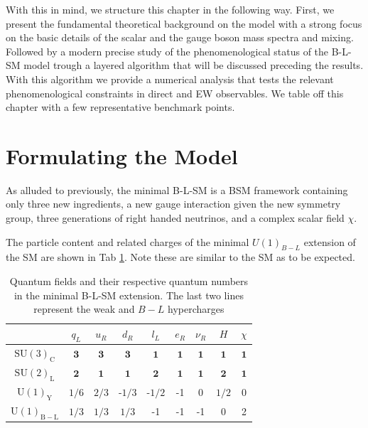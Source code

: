 \documentclass[10pt]{book}
\renewcommand{\(}{\left(}
\renewcommand{\)}{\right)}
\renewcommand{\[}{\left[}
\renewcommand{\]}{\right]}
\begin{document}
With this in mind, we structure this chapter in the following way. First, we present the fundamental theoretical background on the model with a strong focus on the basic details of the scalar and the gauge boson mass spectra and mixing. Followed by a modern precise study of the phenomenological status of the B-L-SM model trough a layered algorithm that will be discussed preceding the results. With this algorithm we provide a numerical analysis that tests the relevant phenomenological constraints in direct and EW observables. We table off this chapter with a few representative benchmark points. 


\section{Formulating the Model}

As alluded to previously, the minimal B-L-SM is a BSM framework containing only three new ingredients, a new gauge interaction given the new symmetry group, three generations of right handed neutrinos, and a complex scalar field $\chi$. 

The particle content and related charges of the minimal $U(1)_{B-L}$ extension of the SM are shown in Tab \ref{tab:BLSM_Charges}. Note these are similar to the SM as to be expected. 
%
\begin{table}[H]
	\centering
	\begin{tabular}{|c|c|c|c|c|c|c|c|c|}
		\hline
		& $q_L$  & $u_R$ & $d_R$ & $l_L$  & $e_R$ & $\nu_R$  &  $H$  & $\chi$  \\ \hline
		$\mathrm{SU(3)_C}$& $\mathbf{3}$ & $\mathbf{3}$  & $\mathbf{3}$  & $\mathbf{1}$  & $\mathbf{1}$   & $\mathbf{1}$   & $\mathbf{1}$    & $\mathbf{1}$    \\
		$\mathrm{SU(2)_L}$& $\mathbf{2}$  & $\mathbf{1}$ & $\mathbf{1}$ & $\mathbf{2}$ & $\mathbf{1}$ & $\mathbf{1}$ & $\mathbf{2}$  & $\mathbf{1}$ \\
		$\mathrm{U(1)_Y}$ & ${1}/{6}$ & ${2}/{3}$  & -${1}/{3}$  & -${1}/{2}$ & -1 & 0 & ${1}/{2}$ & 0 \\
		$\mathrm{U(1)_{B-L}}$ & ${1}/{3}$ & ${1}/{3}$ & ${1}/{3}$  & -1  & -1 &-1  & 0 & 2  \\ \hline 
	\end{tabular}
	\caption{Quantum fields and their respective quantum numbers in the minimal B-L-SM extension. The last two lines represent the weak and $B-L$ hypercharges}
	\label{tab:BLSM_Charges}
\end{table} 
\end{document}
